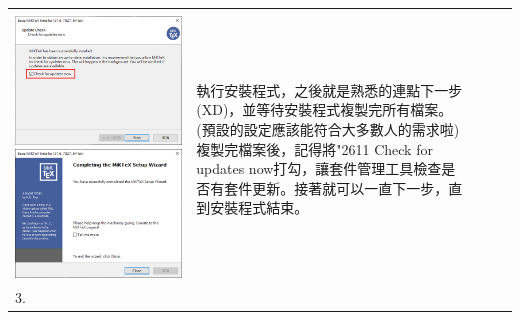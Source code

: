 \documentclass{../indiv}
\begin{document}
\begin{table}[H]
\begin{tabular}{T >{\ttfamily\large}p{2.5em} p{7.3cm} p{6.5cm} T}
\begin{tabmp}[-0.2]
				\includegraphics[width=0.49\linewidth]{miktex-install-3.png}\\[1.5mm]
				\includegraphics[width=0.49\linewidth]{miktex-install-4.png}
				\includegraphics[width=0.49\linewidth]{miktex-install-5.png}
			\end{tabmp} &
			執行安裝程式，之後就是熟悉的連點下一步(XD)，並等待安裝程式複製完所有檔案。(預設的設定應該能符合大多數人的需求啦)\newline
			複製完檔案後，記得將{\char"2611} Check for updates now打勾，讓套件管理工具檢查是否有套件更新。接著就可以一直下一步，直到安裝程式結束。\\
			3. &
			\begin{tabmp}[-0.3]
				\centering

\end{tabmp}
\end{tabular}
\end{table}
\end{document}
